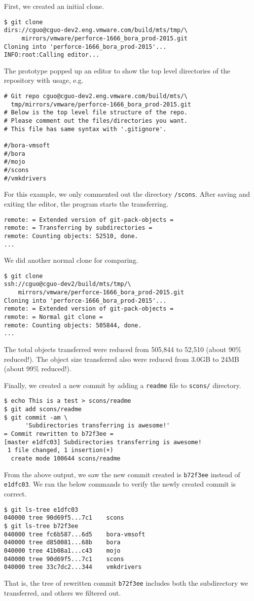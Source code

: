 \documentclass[copyrightwanted=false]{sigplanconf}
\begin{document}
First, we created an initial clone.
\begin{verbatim}
$ git clone
dirs://cguo@cguo-dev2.eng.vmware.com/build/mts/tmp/\
     mirrors/vmware/perforce-1666_bora_prod-2015.git
Cloning into 'perforce-1666_bora_prod-2015'...
INFO:root:Calling editor...
\end{verbatim}
The prototype popped up an editor to show the top level directories of the
repository with usage, e.g.
\begin{verbatim}
# Git repo cguo@cguo-dev2.eng.vmware.com/build/mts/\
  tmp/mirrors/vmware/perforce-1666_bora_prod-2015.git
# Below is the top level file structure of the repo.
# Please comment out the files/directories you want.
# This file has same syntax with '.gitignore'.

#/bora-vmsoft
#/bora
#/mojo
#/scons
#/vmkdrivers
\end{verbatim}

For this example, we only commented out the directory \verb|/scons|.
After saving and exiting the editor, the program starts the transferring.
\begin{verbatim}
remote: = Extended version of git-pack-objects =
remote: = Transferring by subdirectories =
remote: Counting objects: 52510, done.
...
\end{verbatim}

We did another normal clone for comparing.
\begin{verbatim}
$ git clone
ssh://cguo@cguo-dev2/build/mts/tmp/\
    mirrors/vmware/perforce-1666_bora_prod-2015.git
Cloning into 'perforce-1666_bora_prod-2015'...
remote: = Extended version of git-pack-objects =
remote: = Normal git clone =
remote: Counting objects: 505844, done.
...
\end{verbatim}
The total objects transferred were reduced from 505,844 to 52,510 (about 90\%
reduced!).
The object size transferred also were reduced from 3.0GB to 24MB (about 99\%
reduced!).

Finally, we created a new commit by adding a \verb|readme| file to \verb|scons/|
directory.
\begin{verbatim}
$ echo This is a test > scons/readme
$ git add scons/readme
$ git commit -am \
      'Subdirectories transferring is awesome!'
= Commit rewritten to b72f3ee =
[master e1dfc03] Subdirectories transferring is awesome!
 1 file changed, 1 insertion(+)
  create mode 100644 scons/readme
\end{verbatim}
From the above output, we saw the new commit created is \verb|b72f3ee| instead of
\verb|e1dfc03|.
We ran the below commands to verify the newly created commit is correct.
\begin{verbatim}
$ git ls-tree e1dfc03
040000 tree 90d69f5...7c1    scons
$ git ls-tree b72f3ee
040000 tree fc6b587...6d5    bora-vmsoft
040000 tree d850081...68b    bora
040000 tree 41b08a1...c43    mojo
040000 tree 90d69f5...7c1    scons
040000 tree 33c7dc2...344    vmkdrivers
\end{verbatim}
That is, the tree of rewritten commit \verb|b72f3ee| includes both
the subdirectory we transferred, and others we filtered out.
\end{document}
